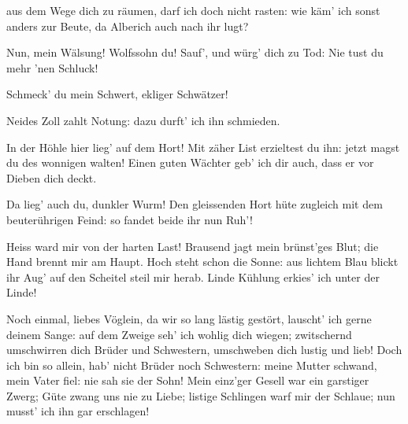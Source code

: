 \begin{drama}

aus dem Wege dich zu räumen,
darf ich doch nicht rasten:
wie käm' ich sonst anders zur Beute,
da Alberich auch nach ihr lugt?


Nun, mein Wälsung!
Wolfssohn du!
Sauf', und würg' dich zu Tod:
Nie tust du mehr 'nen Schluck!


\Siegfriedspeaks

Schmeck' du mein Schwert,
ekliger Schwätzer!


Neides Zoll
zahlt Notung:
dazu durft' ich ihn schmieden.


In der Höhle hier
lieg' auf dem Hort!
Mit zäher List
erzieltest du ihn:
jetzt magst du des wonnigen walten!
Einen guten Wächter
geb' ich dir auch,
dass er vor Dieben dich deckt.


Da lieg' auch du,
dunkler Wurm!
Den gleissenden Hort
hüte zugleich
mit dem beuterührigen Feind:
so fandet beide ihr nun Ruh'!


Heiss ward mir
von der harten Last!
Brausend jagt
mein brünst'ges Blut;
die Hand brennt mir am Haupt.
Hoch steht schon die Sonne:
aus lichtem Blau
blickt ihr Aug'
auf den Scheitel steil mir herab.
Linde Kühlung
erkies' ich unter der Linde!


Noch einmal, liebes Vöglein,
da wir so lang
lästig gestört,
lauscht' ich gerne deinem Sange:
auf dem Zweige seh' ich
wohlig dich wiegen;
zwitschernd umschwirren
dich Brüder und Schwestern,
umschweben dich lustig und lieb!
Doch ich bin so allein,
hab' nicht Brüder noch Schwestern:
meine Mutter schwand,
mein Vater fiel:
nie sah sie der Sohn!
Mein einz'ger Gesell
war ein garstiger Zwerg;
Güte zwang
uns nie zu Liebe;
listige Schlingen
warf mir der Schlaue;
nun musst' ich ihn gar erschlagen!


\end{drama}

